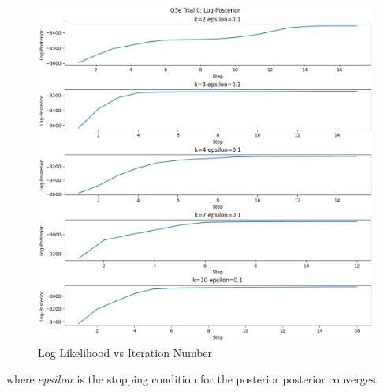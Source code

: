 \documentclass[12pt]{article}
\begin{document}
\begin{enumerate}
{\begin{figure}[h]
\centering
\includegraphics[scale=0.35]{outputs/q3/q3e-0-log-pos}
\caption{Log Likelihood vs Iteration Number}
\label{fig:3d-log-like}
\end{figure}

where $epsilon$ is the stopping condition for the posterior posterior converges.

\newpage

}
\end{enumerate}
\end{document}
